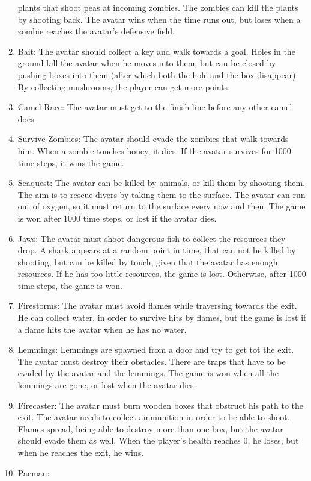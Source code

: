 \begin{enumerate}
		plants that shoot peas at incoming zombies. The zombies can kill the
		plants by shooting back. The avatar wins when the time runs out, but
		loses when a zombie reaches the avatar's defensive field.
	\item Bait: 
		The avatar should collect a key and walk towards a goal. Holes in the
		ground kill the avatar when he moves into them, but can be closed by
		pushing boxes into them (after which both the hole and the box
		disappear). By collecting mushrooms, the player can get more points.
	\item Camel Race:
		The avatar must get to the finish line before any other camel does.
	\item Survive Zombies:
		The avatar should evade the zombies that walk towards him. When a zombie
		touches honey, it dies. If the avatar survives for 1000 time steps, it
		wins the game.
	\item Seaquest:
		The avatar can be killed by animals, or kill them by shooting them. The
		aim is to  rescue divers by taking them to the surface. The avatar can
		run out of oxygen, so it must return to the surface every now and then.
		The game is won after 1000 time steps, or lost if the avatar dies.
	\item Jaws:
		The avatar must shoot dangerous fish to collect the resources they drop.
		A shark appears at a random point in time, that can not be killed by
		shooting, but can be killed by touch, given that the avatar has enough
		resources. If he has too little resources, the game is lost. Otherwise,
		after 1000 time steps, the game is won.
	\item Firestorms:
		The avatar must avoid flames while traversing towards the exit. He can
		collect water, in order to survive hits by flames, but the game is lost
		if a flame hits the avatar when he has no water. 
	\item Lemmings:
		Lemmings are spawned from a door and try to get tot the exit. The avatar
		must destroy their obstacles. There are traps that have to be evaded by
		the avatar and the lemmings. The game is won when all the lemmings are
		gone, or lost when the avatar dies.
	\item Firecaster:
		The avatar must burn wooden boxes that obstruct his path to the exit.
		The avatar needs to collect ammunition in order to be able to shoot.
		Flames spread, being able to destroy more than one box, but the avatar
		should evade them as well. When the player's health reaches 0, he loses,
		but when he reaches the exit, he wins.
	\item Pacman:

\end{enumerate}
